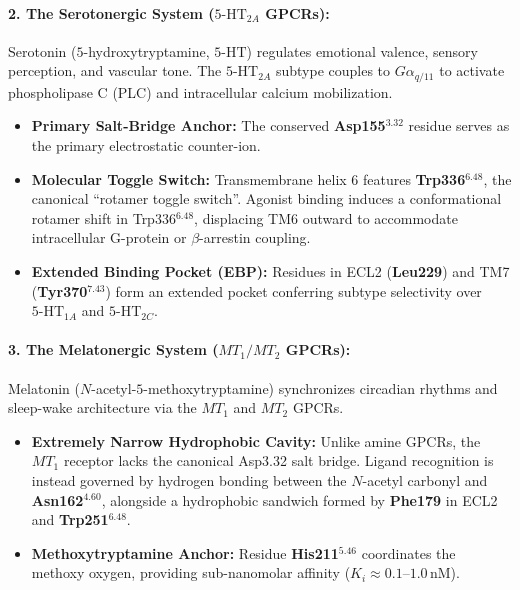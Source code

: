 \documentclass{article}
\theoremstyle{definition}
\begin{document}
\paragraph{2. The Serotonergic System ($5\text{-HT}_{2A}$ GPCRs):}
Serotonin ($5$-hydroxytryptamine, $5\text{-HT}$) regulates emotional valence, sensory perception, and vascular tone. The $5\text{-HT}_{2A}$ subtype couples to $G\alpha_{q/11}$ to activate phospholipase C (PLC) and intracellular calcium mobilization.
\begin{itemize}[leftmargin=1.5em,noitemsep]
    \item \textbf{Primary Salt-Bridge Anchor:} The conserved \textbf{Asp155$^{3.32}$} residue serves as the primary electrostatic counter-ion.
    \item \textbf{Molecular Toggle Switch:} Transmembrane helix 6 features \textbf{Trp336$^{6.48}$}, the canonical ``rotamer toggle switch''. Agonist binding induces a conformational rotamer shift in Trp336$^{6.48}$, displacing TM6 outward to accommodate intracellular G-protein or $\beta$-arrestin coupling.
    \item \textbf{Extended Binding Pocket (EBP):} Residues in ECL2 (\textbf{Leu229}) and TM7 (\textbf{Tyr370$^{7.43}$}) form an extended pocket conferring subtype selectivity over $5\text{-HT}_{1A}$ and $5\text{-HT}_{2C}$.
\end{itemize}

\paragraph{3. The Melatonergic System ($MT_1 / MT_2$ GPCRs):}
Melatonin ($N$-acetyl-$5$-methoxytryptamine) synchronizes circadian rhythms and sleep-wake architecture via the $MT_1$ and $MT_2$ GPCRs.
\begin{itemize}[leftmargin=1.5em,noitemsep]
    \item \textbf{Extremely Narrow Hydrophobic Cavity:} Unlike amine GPCRs, the $MT_1$ receptor lacks the canonical Asp3.32 salt bridge. Ligand recognition is instead governed by hydrogen bonding between the $N$-acetyl carbonyl and \textbf{Asn162$^{4.60}$}, alongside a hydrophobic sandwich formed by \textbf{Phe179} in ECL2 and \textbf{Trp251$^{6.48}$}.
    \item \textbf{Methoxytryptamine Anchor:} Residue \textbf{His211$^{5.46}$} coordinates the methoxy oxygen, providing sub-nanomolar affinity ($K_i \approx 0.1\text{--}1.0 \, \text{nM}$).
\end{itemize}
\end{document}
